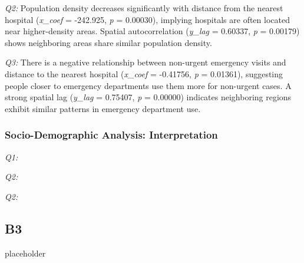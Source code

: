 \documentclass[
	a4paper, %
	10pt, %
	unnumberedsections, %
	twoside, %
]{LTJournalArticle}
\begin{document}
\textit{Q2:} Population density decreases significantly with distance from the nearest hospital (\textit{x\_coef} = -242.925, \textit{p} = 0.00030), implying hospitals are often located near higher-density areas. Spatial autocorrelation (\textit{y\_lag} = 0.60337, \textit{p} = 0.00179) shows neighboring areas share similar population density.

\textit{Q3:} There is a negative relationship between non-urgent emergency visits and distance to the nearest hospital (\textit{x\_coef} = -0.41756, \textit{p} = 0.01361), suggesting people closer to emergency departments use them more for non-urgent cases. A strong spatial lag (\textit{y\_lag} = 0.75407, \textit{p} = 0.00000) indicates neighboring regions exhibit similar patterns in emergency department use.


\subsubsection{Socio-Demographic Analysis: Interpretation}\leavevmode

\textit{Q1:} 

\textit{Q2:} 

\textit{Q2:} 


\subsection{B3}

placeholder



\pagebreak

\onecolumn
\end{document}
